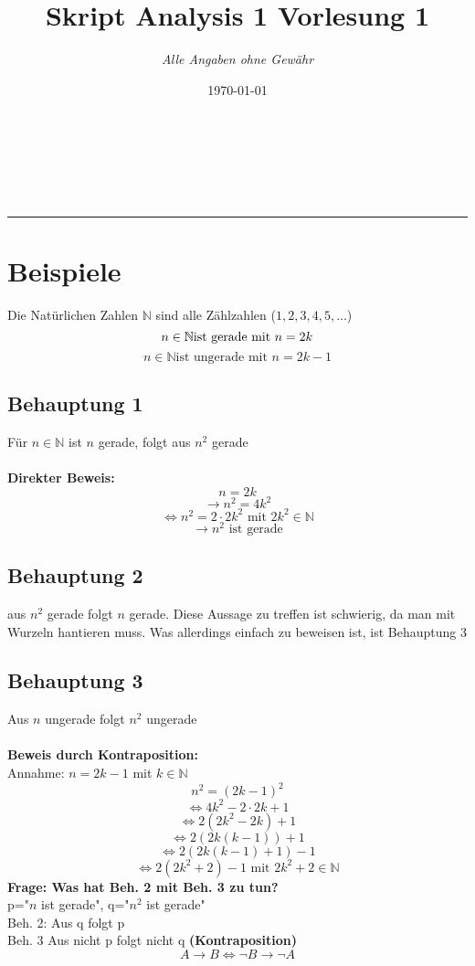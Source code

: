 \documentclass{article}
\title{Skript Analysis 1 Vorlesung 1} %
\author{\textit{Alle Angaben ohne Gewähr}} %
\date{\today} %
\makeatletter
\renewcommand{\maketitle}     
{
	{\raggedright %
		\begin{center}
		{\Huge \bfseries \sffamily \@title }\\[2ex] 
		{\large  \@author } \\[4ex]      
		\@date\\
		\rule{\linewidth}{0.4pt}
		
		\end{center}
	}
}
\makeatother
\begin{document}

	\maketitle %
    \section{Beispiele}
        Die Natürlichen Zahlen $\mathbb{N}$ sind alle Zählzahlen ($1,2,3,4,5,...$) \\
         $$n\in \mathbb{N} \text{ist gerade mit } n=2k\\$$
         $$n\in \mathbb{N} \text{ist ungerade mit } n=2k-1$$
        \subsection{Behauptung 1}
            Für $n\in \mathbb{N}$ ist $n$ gerade, folgt aus $n^2$ gerade\\\\
            \textbf{Direkter Beweis:}\\
                $$n=2k$$
                $$\to n^2= 4k^2$$
                $$\Leftrightarrow n^2= 2\cdot 2k^2 \text{ mit } 2k^2 \in \mathbb{N}$$
                $$\to n^2 \text{ ist gerade}$$
        \subsection{Behauptung 2}
            aus $n^2$ gerade folgt $n$ gerade. Diese Aussage zu treffen ist schwierig, da man mit Wurzeln hantieren muss. Was allerdings einfach zu beweisen ist, ist Behauptung 3
        \subsection{Behauptung 3}
            Aus $n$ ungerade folgt $n^2$ ungerade\\\\
            \textbf{Beweis durch Kontraposition:}\\
                Annahme: $n=2k-1$ mit $k\in \mathbb{N}$
                $$n^2=(2k-1)^2$$
                $$\Leftrightarrow 4k^2-2\cdot 2k+1$$
                $$\Leftrightarrow 2(2k^2-2k)+1$$
                $$\Leftrightarrow 2(2k(k-1))+1$$
                $$\Leftrightarrow 2(2k(k-1)+1)-1$$
                $$\Leftrightarrow  2(2k^2+2)-1 \text{ mit } 2k^2+2 \in \mathbb{N}$$
            \textbf{Frage: Was hat Beh. 2 mit Beh. 3 zu tun?}\\
            p="$n$ ist gerade", q="$n^2$ ist gerade"\\
            Beh. 2: Aus q folgt p\\
            Beh. 3 Aus nicht p folgt nicht q \textbf{(Kontraposition)}
            \textbf{$$A\to B \Leftrightarrow \lnot B \to \lnot A$$}
\end{document}
